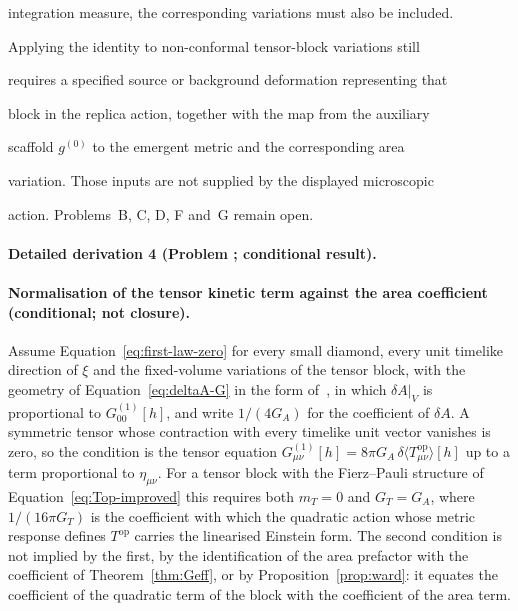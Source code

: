 integration measure, the corresponding variations must also be included.

Applying the identity to non-conformal tensor-block variations still

requires a specified source or background deformation representing that

block in the replica action, together with the map from the auxiliary

scaffold \(g^{(0)}\) to the emergent metric and the corresponding area

variation. Those inputs are not supplied by the displayed microscopic

action. Problems~B, C, D, F and~G remain open.



\paragraph{Detailed derivation 4 (Problem ; conditional result).} \label{ref:detail-3} %



\paragraph{Normalisation of the tensor kinetic term against the area coefficient (conditional; not closure).}

Assume Equation~\eqref{eq:first-law-zero} for every small diamond, every unit timelike direction of \(\xi\) and the fixed-volume variations of the tensor block, with the geometry of Equation~\eqref{eq:deltaA-G} in the form of~\cite{Jacobson2016}, in which \(\delta A|_V\) is proportional to \(G^{(1)}_{00}[h]\), and write \(1/(4G_A)\) for the coefficient of \(\delta A\). A symmetric tensor whose contraction with every timelike unit vector vanishes is zero, so the condition is the tensor equation \(G^{(1)}_{\mu\nu}[h]=8\pi G_A\,\delta\langle T^{\mathrm{op}}_{\mu\nu}\rangle[h]\) up to a term proportional to \(\eta_{\mu\nu}\). For a tensor block with the Fierz--Pauli structure of Equation~\eqref{eq:Top-improved} this requires both \(m_T=0\) and \(G_T=G_A\), where \(1/(16\pi G_T)\) is the coefficient with which the quadratic action whose metric response defines \(T^{\mathrm{op}}\) carries the linearised Einstein form. The second condition is not implied by the first, by the identification of the area prefactor with the coefficient of Theorem~\ref{thm:Geff}, or by Proposition~\ref{prop:ward}: it equates the coefficient of the quadratic term of the block with the coefficient of the area term.



